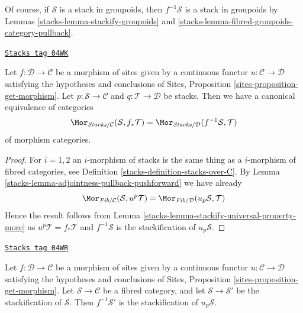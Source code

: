 Of course, if $\mathcal{S}$ is a stack in groupoids, then $f^{-1}\mathcal{S}$
is a stack in groupoids by
Lemmas \ref{stacks-lemma-stackify-groupoids} and
\ref{stacks-lemma-fibred-groupoids-category-pullback}.

\begin{lemma}
\label{stacks-lemma-adjointness-pullback-pushforward-stacks}
\href{https://stacks.math.columbia.edu/tag/04WK}{\texttt{Stacks tag 04WK}}

Let $f : \mathcal{D} \to \mathcal{C}$ be a morphism of sites
given by a continuous functor $u : \mathcal{C} \to \mathcal{D}$
satisfying the hypotheses and conclusions of
Sites, Proposition \ref{sites-proposition-get-morphism}.
Let $p : \mathcal{S} \to \mathcal{C}$ and
$q : \mathcal{T} \to \mathcal{D}$ be stacks.
Then we have a canonical equivalence of categories
$$
\Mor_{\textit{Stacks}/\mathcal{C}}(\mathcal{S}, f_*\mathcal{T})
=
\Mor_{\textit{Stacks}/\mathcal{D}}(f^{-1}\mathcal{S}, \mathcal{T})
$$
of morphism categories.
\end{lemma}

\begin{proof}

For $i = 1, 2$ an $i$-morphism of stacks is the same thing as a
$i$-morphism of fibred categories, see
Definition \ref{stacks-definition-stacks-over-C}.
By
Lemma \ref{stacks-lemma-adjointness-pullback-pushforward}
we have already
$$
\Mor_{\textit{Fib}/\mathcal{C}}(\mathcal{S}, u^p\mathcal{T})
=
\Mor_{\textit{Fib}/\mathcal{D}}(u_p\mathcal{S}, \mathcal{T})
$$
Hence the result follows from
Lemma \ref{stacks-lemma-stackify-universal-property-more}
as $u^p\mathcal{T} = f_*\mathcal{T}$ and $f^{-1}\mathcal{S}$ is the
stackification of $u_p\mathcal{S}$.
\end{proof}

\begin{lemma}[Technical up]
\label{stacks-lemma-technical-up}
\href{https://stacks.math.columbia.edu/tag/04WR}{\texttt{Stacks tag 04WR}}

Let $f : \mathcal{D} \to \mathcal{C}$ be a morphism of sites
given by a continuous functor $u : \mathcal{C} \to \mathcal{D}$
satisfying the hypotheses and conclusions of
Sites, Proposition \ref{sites-proposition-get-morphism}.
Let $\mathcal{S} \to \mathcal{C}$ be a fibred category, and
let $\mathcal{S} \to \mathcal{S}'$ be the stackification of $\mathcal{S}$.
Then $f^{-1}\mathcal{S}'$ is the stackification of
$u_p\mathcal{S}$.
\end{lemma}

